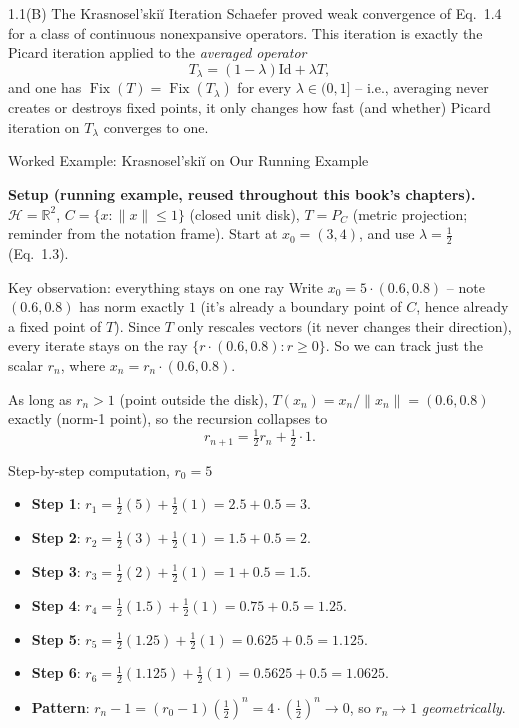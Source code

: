 \documentclass[aspectratio=169,10pt]{beamer}
\newcommand{\Hil}{\mathcal{H}}
\newcommand{\Fix}{\operatorname{Fix}}
\newcommand{\R}{\mathbb{R}}
\newcommand{\Id}{\mathrm{Id}}
\begin{document}
\begin{frame}[allowframebreaks]{1.1(B) The Krasnosel'ski\u{i} Iteration}
Schaefer proved weak convergence of Eq.\ 1.4 for a class of continuous
nonexpansive operators. This iteration is exactly the Picard iteration
applied to the \emph{averaged operator}
\[
  T_\lambda = (1-\lambda)\Id + \lambda T,
\]
and one has $\Fix(T)=\Fix(T_\lambda)$ for every $\lambda\in(0,1]$ -- i.e.,
averaging never creates or destroys fixed points, it only changes how fast
(and whether) Picard iteration on $T_\lambda$ converges to one.

\end{frame}

\begin{frame}[allowframebreaks]{Worked Example: Krasnosel'ski\u{i} on Our Running Example}

\textbf{Setup (running example, reused throughout this book's chapters).}
$\Hil=\R^2$, $C=\{x:\|x\|\le 1\}$ (closed unit disk), $T=P_C$ (metric
projection; reminder from the notation frame). Start at $x_0=(3,4)$, and
use $\lambda=\tfrac12$ (Eq.\ 1.3).

\begin{block}{Key observation: everything stays on one ray}
Write $x_0 = 5\cdot(0.6,0.8)$ -- note $(0.6,0.8)$ has norm exactly $1$
(it's already a boundary point of $C$, hence already a fixed point of
$T$). Since $T$ only rescales vectors (it never changes their direction),
every iterate stays on the ray $\{r\cdot(0.6,0.8): r\ge 0\}$. So we can
track just the scalar $r_n$, where $x_n = r_n\cdot(0.6,0.8)$.
\end{block}

As long as $r_n>1$ (point outside the disk), $T(x_n)=x_n/\|x_n\| =
(0.6,0.8)$ exactly (norm-1 point), so the recursion collapses to
\[
  r_{n+1} = \tfrac12 r_n + \tfrac12\cdot 1.
\]

\framebreak

\begin{block}{Step-by-step computation, $r_0=5$}
\begin{itemize}
  \item \textbf{Step 1}: $r_1 = \tfrac12(5) + \tfrac12(1) = 2.5+0.5 = 3$.
  \item \textbf{Step 2}: $r_2 = \tfrac12(3) + \tfrac12(1) = 1.5+0.5 = 2$.
  \item \textbf{Step 3}: $r_3 = \tfrac12(2) + \tfrac12(1) = 1+0.5 = 1.5$.
  \item \textbf{Step 4}: $r_4 = \tfrac12(1.5)+\tfrac12(1) = 0.75+0.5 = 1.25$.
  \item \textbf{Step 5}: $r_5 = \tfrac12(1.25)+\tfrac12(1) = 0.625+0.5=1.125$.
  \item \textbf{Step 6}: $r_6 = \tfrac12(1.125)+\tfrac12(1) = 0.5625+0.5=1.0625$.
  \item \textbf{Pattern}: $r_n - 1 = (r_0-1)\left(\tfrac12\right)^n =
    4\cdot(\tfrac12)^n \to 0$, so $r_n\to 1$ \emph{geometrically}.
\end{itemize}
\end{block}


\end{frame}
\end{document}
